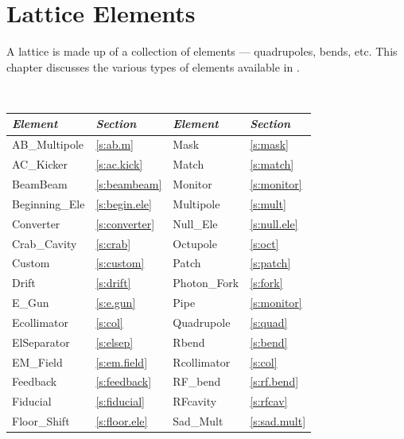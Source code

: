 \chapter{Lattice Elements}
\label{c:elements}

A lattice is made up of a collection of elements --- quadrupoles,
bends, etc. This chapter discusses the various types of elements
available in \bmad.

\begin{table}[htb]
\centering
{\tt
\begin{tabular}{llll} \toprule
  {\it Element}     & {\it Section}         & {\it Element}      & {\it Section}      \\ \midrule
  AB_Multipole      & \ref{s:ab.m}          &  Mask              & \ref{s:mask}       \\
  AC_Kicker         & \ref{s:ac.kick}       &  Match             & \ref{s:match}      \\
  BeamBeam          & \ref{s:beambeam}      &  Monitor           & \ref{s:monitor}    \\
  Beginning_Ele     & \ref{s:begin.ele}     &  Multipole         & \ref{s:mult}       \\
  Converter         & \ref{s:converter}     &  Null_Ele          & \ref{s:null.ele}   \\
  Crab_Cavity       & \ref{s:crab}          &  Octupole          & \ref{s:oct}        \\
  Custom            & \ref{s:custom}        &  Patch             & \ref{s:patch}      \\
  Drift             & \ref{s:drift}         &  Photon_Fork       & \ref{s:fork}       \\
  E_Gun             & \ref{s:e.gun}         &  Pipe              & \ref{s:monitor}    \\
  Ecollimator       & \ref{s:col}           &  Quadrupole        & \ref{s:quad}       \\
  ElSeparator       & \ref{s:elsep}         &  Rbend             & \ref{s:bend}       \\
  EM_Field          & \ref{s:em.field}      &  Rcollimator       & \ref{s:col}        \\
  Feedback          & \ref{s:feedback}      &  RF_bend           & \ref{s:rf.bend}    \\
  Fiducial          & \ref{s:fiducial}      &  RFcavity          & \ref{s:rfcav}      \\
  Floor_Shift       & \ref{s:floor.ele}     &  Sad_Mult          & \ref{s:sad.mult}   \\

\end{tabular}}
\end{table}
